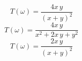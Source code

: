 

\begin{equation}T(\omega) = \frac{4x\,y}{(x+y)^2}\label{t1}\end{equation}
\begin{equation}T(\omega) = \frac{4x\,y}{x^2+2x\,y+y^2}\label{t2}\end{equation}
\begin{equation}T(\omega) = \frac{2x\,y}{(x+y)^2}\label{t3}\end{equation}


